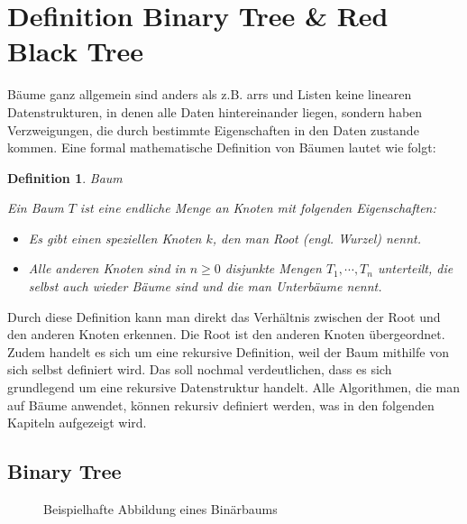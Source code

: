 \documentclass[11pt]{article}
\newtheorem{definition}{Definition}
\begin{document}
\section{Definition Binary Tree \& Red Black Tree} \label{def}

Bäume ganz allgemein sind anders als z.B. \glspl{arr} und Listen keine linearen Datenstrukturen, in denen alle Daten hintereinander liegen, sondern haben Verzweigungen, die durch bestimmte Eigenschaften in den Daten zustande kommen.
Eine formal mathematische Definition von Bäumen lautet wie folgt:

\begin{definition}{Baum} \label{def_bin}
  
Ein Baum $T$ ist eine endliche Menge an Knoten mit folgenden Eigenschaften: 

\begin{itemize}
  \item Es gibt einen speziellen Knoten $k$, den man Root (engl. Wurzel) nennt.
  \item Alle anderen Knoten sind in $n \geq 0$ disjunkte Mengen $T_1, \cdots, T_n$ unterteilt, die selbst auch wieder Bäume sind und die man Unterbäume nennt. 
\end{itemize}
\end{definition}

Durch diese Definition kann man direkt das Verhältnis zwischen der Root und den anderen Knoten erkennen. Die Root ist den anderen Knoten übergeordnet. 
Zudem handelt es sich um eine rekursive Definition, weil der Baum mithilfe von sich selbst definiert wird.
Das soll nochmal verdeutlichen, dass es sich grundlegend um eine rekursive Datenstruktur handelt. Alle Algorithmen, die man auf Bäume anwendet, können rekursiv definiert werden, was in den folgenden 
Kapiteln aufgezeigt wird.
\cite[S. 308]{aop}

\pagebreak

\subsection{Binary Tree}

\begin{figure}    
    \caption{Beispielhafte Abbildung eines Binärbaums}
    \label{bin_ex}
\end{figure}
\end{document}
